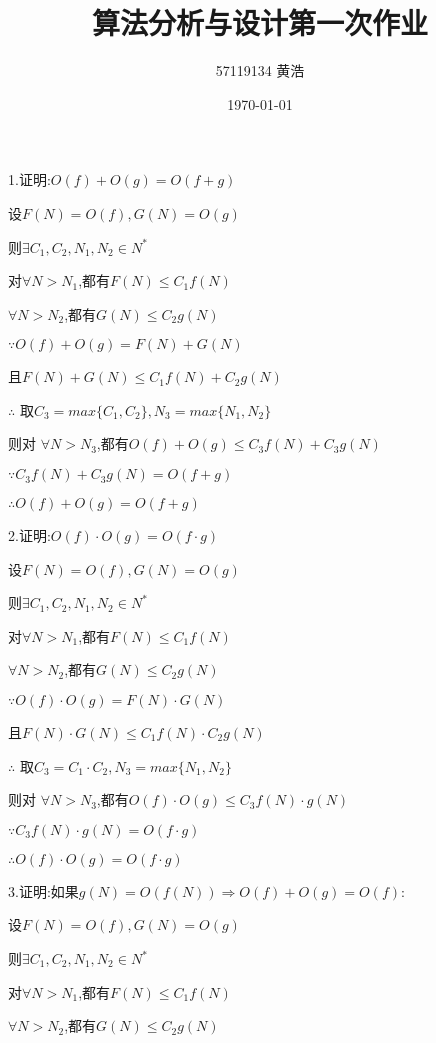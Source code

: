 \documentclass[UTF8]{ctexart}
\title{算法分析与设计第一次作业}
\author{57119134 黄浩}
\date{\today}
\begin{document}
\maketitle
1.证明:$O(f) + O(g) = O(f + g)$

\qquad 设$F(N) = O(f),G(N) = O(g)$

\qquad 则$\exists C_1,C_2,N_1,N_2 \in N^*$

\qquad 对$\forall N > N_1$,都有$F(N) \le C_1f(N)$

\qquad \quad $\forall N > N_2$,都有$G(N) \le C_2g(N)$

\qquad  $\because O(f) + O(g) = F(N) + G(N)$

\qquad \quad 且$F(N) + G(N) \le C_1f(N) + C_2g(N)$

\qquad  $\therefore$ 取$C_3 = max\{C_1, C_2\}, N_3 = max\{N_1, N_2\}$

\qquad \quad 则对 $\forall N > N_3$,都有$O(f) + O(g) \le C_3f(N) + C_3g(N)$

\qquad $\because  C_3f(N) + C_3g(N) = O(f + g)$

\qquad $\therefore O(f) + O(g) = O(f + g)$

2.证明:$O(f) \cdot O(g) = O(f \cdot g)$

\qquad 设$F(N) = O(f),G(N) = O(g)$

\qquad 则$\exists C_1,C_2,N_1,N_2 \in N^*$

\qquad 对$\forall N > N_1$,都有$F(N) \le C_1f(N)$

\qquad \quad $\forall N > N_2$,都有$G(N) \le C_2g(N)$

\qquad  $\because O(f) \cdot O(g) = F(N) \cdot G(N)$

\qquad \quad 且$F(N) \cdot G(N) \le C_1f(N) \cdot C_2g(N)$

\qquad  $\therefore$ 取$C_3 = C_1 \cdot C_2, N_3 = max\{N_1, N_2\}$

\qquad \quad 则对 $\forall N > N_3$,都有$O(f) \cdot O(g) \le C_3f(N) \cdot g(N)$

\qquad $\because  C_3f(N) \cdot g(N) = O(f \cdot g)$

\qquad $\therefore O(f) \cdot O(g) = O(f \cdot g)$

3.证明:如果$g(N) = O(f(N))\Rightarrow O(f) + O(g) = O(f)$:

\qquad 设$F(N) = O(f),G(N) = O(g)$

\qquad 则$\exists C_1, C_2, N_1, N_2 \in N^*$

\qquad 对$\forall N > N_1$,都有$F(N) \le C_1f(N)$

\qquad \quad $\forall N > N_2$,都有$G(N) \le C_2g(N)$
\end{document}
